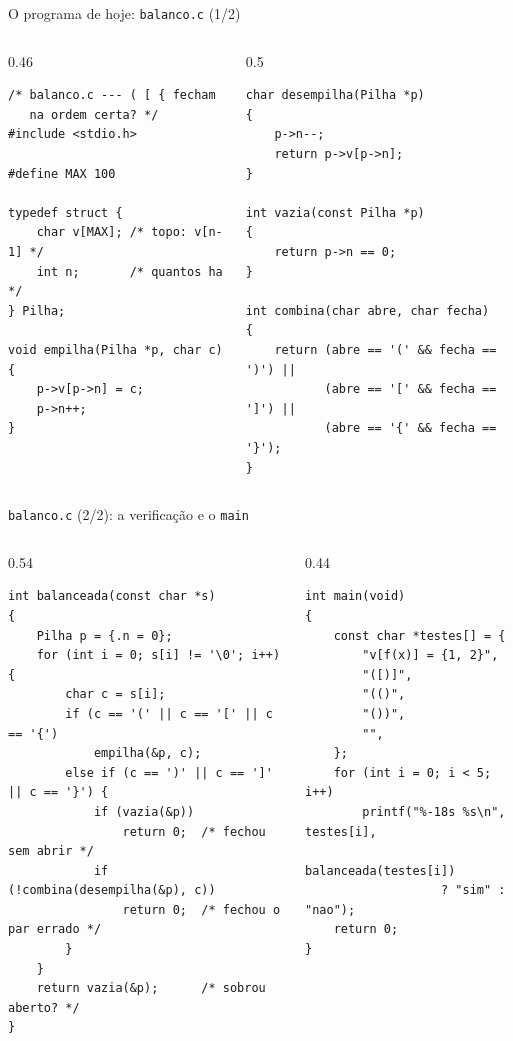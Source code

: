 \documentclass[aspectratio=169]{beamer}
\begin{document}
\begin{frame}[fragile]{O programa de hoje: \texttt{balanco.c} (1/2)}
  \begin{columns}[T]
    \begin{column}{0.46\textwidth}
\begin{lstlisting}[style=codC]
/* balanco.c --- ( [ { fecham
   na ordem certa? */
#include <stdio.h>

#define MAX 100

typedef struct {
    char v[MAX]; /* topo: v[n-1] */
    int n;       /* quantos ha */
} Pilha;

void empilha(Pilha *p, char c)
{
    p->v[p->n] = c;
    p->n++;
}
\end{lstlisting}
    \end{column}
    \begin{column}{0.5\textwidth}
\begin{lstlisting}[style=codC]
char desempilha(Pilha *p)
{
    p->n--;
    return p->v[p->n];
}

int vazia(const Pilha *p)
{
    return p->n == 0;
}

int combina(char abre, char fecha)
{
    return (abre == '(' && fecha == ')') ||
           (abre == '[' && fecha == ']') ||
           (abre == '{' && fecha == '}');
}
\end{lstlisting}
    \end{column}
  \end{columns}
\end{frame}

\begin{frame}[fragile]{\texttt{balanco.c} (2/2): a verificação e o \texttt{main}}
  \vspace{-0.4em}
  \begin{columns}[T]
    \begin{column}{0.54\textwidth}
\begin{lstlisting}[style=codC]
int balanceada(const char *s)
{
    Pilha p = {.n = 0};
    for (int i = 0; s[i] != '\0'; i++) {
        char c = s[i];
        if (c == '(' || c == '[' || c == '{')
            empilha(&p, c);
        else if (c == ')' || c == ']' || c == '}') {
            if (vazia(&p))
                return 0;  /* fechou sem abrir */
            if (!combina(desempilha(&p), c))
                return 0;  /* fechou o par errado */
        }
    }
    return vazia(&p);      /* sobrou aberto? */
}
\end{lstlisting}
    \end{column}
    \begin{column}{0.44\textwidth}
\begin{lstlisting}[style=codC]
int main(void)
{
    const char *testes[] = {
        "v[f(x)] = {1, 2}",
        "([)]",
        "(()",
        "())",
        "",
    };
    for (int i = 0; i < 5; i++)
        printf("%-18s %s\n", testes[i],
               balanceada(testes[i])
                   ? "sim" : "nao");
    return 0;
}
\end{lstlisting}
    \end{column}
  \end{columns}
\end{frame}
\end{document}
